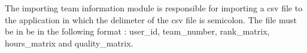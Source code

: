The importing team information module is responsible for importing a csv file to the application in which the delimeter of the csv file is semicolon. The file must be in be in the following format : user\_id, team\_number, rank\_matrix, hours\_matrix and quality\_matrix. 


